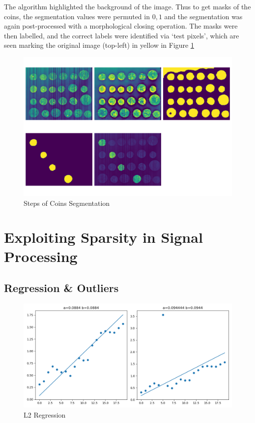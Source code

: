 \documentclass[12pt]{article}
\begin{document}
The algorithm highlighted the background of the image.
Thus to get masks of the coins, the segmentation values were permuted in ${0,1}$ and the segmentation was again post-processed with a morphological closing operation.
The masks were then labelled, and the correct labels were identified via `test pixels', which are seen marking the original image (top-left) in yellow in Figure \ref{fig:coins}

\begin{figure}[hp]
    \includegraphics[scale=0.35]{figures/coins_segmentation.png}
    \caption{Steps of Coins Segmentation}
    \label{fig:coins}
\end{figure}

\section{Exploiting Sparsity in Signal Processing}

\subsection{Regression \& Outliers}

\begin{figure}[hp]
    \includegraphics[scale=0.5]{figures/regression_l2.png}
    \caption{L2 Regression}
    \label{fig:regression_l2}
\end{figure}
\end{document}

